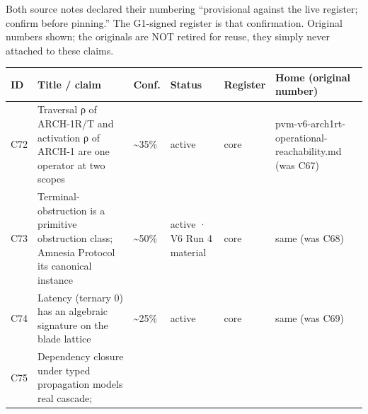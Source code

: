 \documentclass[
  11pt,
]{article}
\newcounter{none} %
\begin{document}
Both source notes declared their numbering ``provisional against the
live register; confirm before pinning.'' The G1-signed register is that
confirmation. Original numbers shown; the originals are NOT retired for
reuse, they simply never attached to these claims.

{\def\LTcaptype{none} %
\begin{longtable}[]{@{}
  >{\raggedright\arraybackslash}p{}
  >{\raggedright\arraybackslash}p{}
  >{\raggedright\arraybackslash}p{}
  >{\raggedright\arraybackslash}p{}
  >{\raggedright\arraybackslash}p{}
  >{\raggedright\arraybackslash}p{}@{}}
\toprule\noalign{}
\begin{minipage}[b]{\linewidth}\raggedright
ID
\end{minipage} & \begin{minipage}[b]{\linewidth}\raggedright
Title / claim
\end{minipage} & \begin{minipage}[b]{\linewidth}\raggedright
Conf.
\end{minipage} & \begin{minipage}[b]{\linewidth}\raggedright
Status
\end{minipage} & \begin{minipage}[b]{\linewidth}\raggedright
Register
\end{minipage} & \begin{minipage}[b]{\linewidth}\raggedright
Home (original number)
\end{minipage} \\
\midrule\noalign{}
\endhead
\bottomrule\noalign{}
\endlastfoot
C72 & Traversal ρ of ARCH-1R/T and activation ρ of ARCH-1 are one
operator at two scopes & \textasciitilde35\% & active & core &
pvm-v6-arch1rt-operational-reachability.md (was C67) \\
C73 & Terminal-obstruction is a primitive obstruction class; Amnesia
Protocol its canonical instance & \textasciitilde50\% & active · V6 Run
4 material & core & same (was C68) \\
C74 & Latency (ternary 0) has an algebraic signature on the blade
lattice & \textasciitilde25\% & active & core & same (was C69) \\
C75 & Dependency closure under typed propagation models real cascade;

\end{longtable}}
\end{document}
